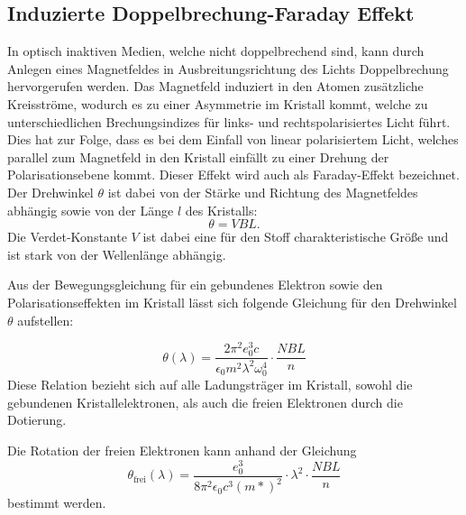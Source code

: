 \subsection{Induzierte Doppelbrechung-Faraday Effekt}
In optisch inaktiven Medien, welche nicht doppelbrechend sind, kann durch Anlegen eines Magnetfeldes in Ausbreitungsrichtung des Lichts
Doppelbrechung hervorgerufen werden. Das Magnetfeld induziert in den Atomen zusätzliche Kreisströme, wodurch es zu einer Asymmetrie im
Kristall kommt, welche zu unterschiedlichen Brechungsindizes für links- und rechtspolarisiertes Licht führt. Dies hat zur Folge, dass es
bei dem Einfall von linear polarisiertem Licht, welches parallel zum Magnetfeld in den Kristall einfällt zu einer Drehung der
Polarisationsebene kommt. Dieser Effekt wird auch als Faraday-Effekt bezeichnet.
Der Drehwinkel $\theta$ ist dabei von der Stärke und Richtung des Magnetfeldes abhängig sowie von der Länge $l$ des Kristalls:
\begin{equation}
  \theta=VBL.
\end{equation}
Die Verdet-Konstante $V$ ist dabei eine für den Stoff charakteristische Größe und ist stark von der Wellenlänge abhängig.

Aus der Bewegungsgleichung für ein gebundenes Elektron sowie den Polarisationseffekten im Kristall lässt sich folgende Gleichung
für den Drehwinkel $\theta$ aufstellen:

\begin{equation}
  \theta(\lambda)=\frac{2\pi^2e_0^3c}{\epsilon_0 m^2 \lambda^2 \omega_0^4}\cdot\frac{NBL}{n}
\end{equation}
Diese Relation bezieht sich auf alle Ladungsträger im Kristall, sowohl die gebundenen Kristallelektronen, als auch die
freien Elektronen durch die Dotierung.

Die Rotation der freien Elektronen kann anhand der Gleichung
\begin{equation}
  \theta_\text{frei}(\lambda)=\frac{e_0^3}{8\pi^2\epsilon_0c^3(m*)^2}\cdot\lambda^2\cdot\frac{NBL}{n}
  \label{eqn:rot}
\end{equation}
bestimmt werden.
